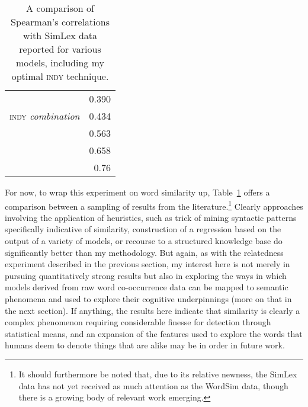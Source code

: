 \begin{table}
\centering
\begin{tabular}{lr}
\hline
\cite{MaEA2017} & 0.390 \\
\textsc{indy} \emph{combination} & 0.434 \\
\cite{SchwartzEA2015} & 0.563 \\
\cite{BanjadeEA2015} & 0.658 \\
\cite{RecskiEA2016} & 0.76 \\
\hline
\end{tabular}
\caption[Comparison of Similarity Scores]{A comparison of Spearman's correlations with SimLex data reported for various models, including my optimal \textsc{indy} technique.}
\label{tab:simpare}
\end{table}

For now, to wrap this experiment on word similarity up, Table~\ref{tab:simpare} offers a comparison between a sampling of results from the literature.\footnote{It should furthermore be noted that, due to its relative newness, the SimLex data has not yet received as much attention as the WordSim data, though there is a growing body of relevant work emerging.}  Clearly approaches involving the application of heuristics, such as  trick of mining syntactic patterns specifically indicative of similarity,  construction of a regression based on the output of a variety of models, or  recourse to a structured knowledge base do significantly better than my methodology.  But again, as with the relatedness experiment described in the previous section, my interest here is not merely in pursuing quantitatively strong results but also in exploring the ways in which models derived from raw word co-occurrence data can be mapped to semantic phenomena and used to explore their cognitive underpinnings (more on that in the next section).  If anything, the results here indicate that similarity is clearly a complex phenomenon requiring considerable finesse for detection through statistical means, and an expansion of the features used to explore the words that humans deem to denote things that are alike may be in order in future work.

